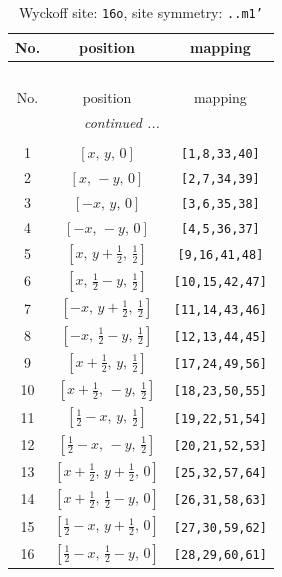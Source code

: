 \documentclass[fleqn,8pt]{jsarticle}
\begin{document}
\renewcommand{\arraystretch}{1.2}
\begin{longtable}{ccc}
\caption{Wyckoff site: {\tt 16o}, site symmetry: {\tt ..m1'}}
 \\
 \hline \hline
No. & position & mapping \\ \hline \endfirsthead

\multicolumn{2}{l}{\tablename\ \thetable{}} \\
 \hline \hline
No. & position & mapping \\ \hline \endhead

 \hline \hline
\multicolumn{2}{r}{\footnotesize\it continued ...} \\ \endfoot

 \hline \hline
\multicolumn{2}{r}{} \\ \endlastfoot

1 & $\left[ x,\, y,\, 0 \right]$ & {\tt [1,8,33,40]} \\ \hline
2 & $\left[ x,\, - y,\, 0 \right]$ & {\tt [2,7,34,39]} \\ \hline
3 & $\left[ - x,\, y,\, 0 \right]$ & {\tt [3,6,35,38]} \\ \hline
4 & $\left[ - x,\, - y,\, 0 \right]$ & {\tt [4,5,36,37]} \\ \hline
5 & $\left[ x,\, y + \frac{1}{2},\, \frac{1}{2} \right]$ & {\tt [9,16,41,48]} \\ \hline
6 & $\left[ x,\, \frac{1}{2} - y,\, \frac{1}{2} \right]$ & {\tt [10,15,42,47]} \\ \hline
7 & $\left[ - x,\, y + \frac{1}{2},\, \frac{1}{2} \right]$ & {\tt [11,14,43,46]} \\ \hline
8 & $\left[ - x,\, \frac{1}{2} - y,\, \frac{1}{2} \right]$ & {\tt [12,13,44,45]} \\ \hline
9 & $\left[ x + \frac{1}{2},\, y,\, \frac{1}{2} \right]$ & {\tt [17,24,49,56]} \\ \hline
10 & $\left[ x + \frac{1}{2},\, - y,\, \frac{1}{2} \right]$ & {\tt [18,23,50,55]} \\ \hline
11 & $\left[ \frac{1}{2} - x,\, y,\, \frac{1}{2} \right]$ & {\tt [19,22,51,54]} \\ \hline
12 & $\left[ \frac{1}{2} - x,\, - y,\, \frac{1}{2} \right]$ & {\tt [20,21,52,53]} \\ \hline
13 & $\left[ x + \frac{1}{2},\, y + \frac{1}{2},\, 0 \right]$ & {\tt [25,32,57,64]} \\ \hline
14 & $\left[ x + \frac{1}{2},\, \frac{1}{2} - y,\, 0 \right]$ & {\tt [26,31,58,63]} \\ \hline
15 & $\left[ \frac{1}{2} - x,\, y + \frac{1}{2},\, 0 \right]$ & {\tt [27,30,59,62]} \\ \hline
16 & $\left[ \frac{1}{2} - x,\, \frac{1}{2} - y,\, 0 \right]$ & {\tt [28,29,60,61]} \\
\end{longtable}
\end{document}
